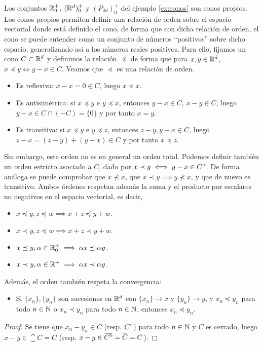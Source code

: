 \documentclass{book}
\begin{document}
Los conjuntos $\mathbb{R}^+_0$, $(\mathbb{R}^d)^+_0$ y $(P_{2d})^+_0$ del ejemplo \ref{ex:conos} son conos propios. Los conos propios permiten definir una relación de orden sobre el espacio vectorial donde está definido el cono, de forma que con dicha relación de orden, el cono se puede entender como un conjunto de números ``positivos'' sobre dicho espacio, generalizando así a los números reales positivos. Para ello, fijamos un cono $C \subset \mathbb{R}^d$ y definimos la relación $\preceq$ de forma que para $x,y \in \mathbb{R}^d$, $x \preceq y \iff y - x \in C$. Veamos que $\preceq$ es una relación de orden.
\begin{itemize}
	\item Es reflexiva: $x-x = 0 \in C$, luego $x \preceq x$.
	\item Es antisimétrica: si $x \preceq y$ e $y \preceq x$, entonces $y - x \in C$, $x - y \in C$, luego $y-x \in C\cap(-C)=\{0\}$ y por tanto $x=y$.
	\item Es transitiva: si $x \preceq y$ e $y \preceq z$, entonces $z-y, y-x \in C$, luego $z-x = (z-y)+(y-x) \in C$ y por tanto $x \preceq z$.
\end{itemize}
Sin embargo, este orden no es en general un orden total. Podemos definir también un orden estricto asociado a $C$, dado por $x \prec y \iff y - x \in {\kern0ptC}^{\mathrm{o}}$. De forma análoga se puede comprobar que $x \not\prec x$, que $x \prec y \implies y \not\prec x$, y que de nuevo es transitivo. Ambos órdenes respetan además la suma y el producto por escalares no negativos en el espacio vectorial, es decir,
\begin{itemize}
	\item $x \preceq y, z \preceq w \implies x+z \preceq y+w$.
	\item $x \prec y, z \preceq w \implies x+z \prec y+w$.
	\item $x \preceq y, \alpha \in \mathbb{R}^+_0 \implies \alpha x \preceq \alpha y$.
	\item $x \prec y, \alpha \in \mathbb{R}^+ \implies \alpha x \prec \alpha y$.
\end{itemize}
Además, el orden también respeta la convergencia:
\begin{itemize}
	\item Si $\{x_n\},\{y_n\}$ son sucesiones en $\mathbb{R}^d$ con $\{x_n\} \to x$ y $\{y_n\} \to y$, y $x_n \preceq y_n$ para todo $n \in \mathbb{N}$ o $x_n \prec y_n$ para todo $n \in \mathbb{N}$, entonces $x_n \preceq y_n$.
\end{itemize}
\begin{proof}
	Se tiene que $x_n - y_n \in C$ (resp. ${\kern0ptC}^{\mathrm{o}}$) para todo $n \in \mathbb{N}$ y $C$ es cerrado, luego $x-y \in \closure{C} = C$ (resp. $x-y \in \closure{\interior{C}} = \closure{C} = C$).
\end{proof}
\end{document}
